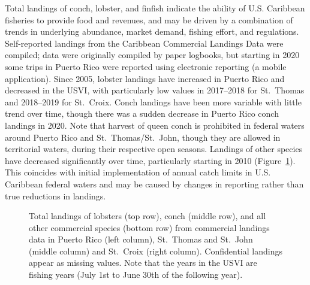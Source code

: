 \documentclass[
  letterpaper,
  oneside,
  open=any]{scrbook}
\begin{document}
Total landings of conch, lobster, and finfish indicate the ability of
U.S. Caribbean fisheries to provide food and revenues, and may be driven
by a combination of trends in underlying abundance, market demand,
fishing effort, and regulations. Self-reported landings from the
Caribbean Commercial Landings Data were compiled; data were originally
compiled by paper logbooks, but starting in 2020 some trips in Puerto
Rico were reported using electronic reporting (a mobile application).
Since 2005, lobster landings have increased in Puerto Rico and decreased
in the USVI, with particularly low values in 2017--2018 for St.~Thomas
and 2018--2019 for St.~Croix. Conch landings have been more variable
with little trend over time, though there was a sudden decrease in
Puerto Rico conch landings in 2020. Note that harvest of queen conch is
prohibited in federal waters around Puerto Rico and St.~Thomas/St.~John,
though they are allowed in territorial waters, during their respective
open seasons. Landings of other species have decreased significantly
over time, particularly starting in 2010 (Figure~\ref{fig-totalland}).
This coincides with initial implementation of annual catch limits in
U.S. Caribbean federal waters and may be caused by changes in reporting
rather than true reductions in landings.

\begin{figure}


\caption{\label{fig-totalland}Total landings of lobsters (top row),
conch (middle row), and all other commercial species (bottom row) from
commercial landings data in Puerto Rico (left column), St.~Thomas and
St.~John (middle column) and St.~Croix (right column). Confidential
landings appear as missing values. Note that the years in the USVI are
fishing years (July 1st to June 30th of the following year).}

\end{figure}%
\end{document}
